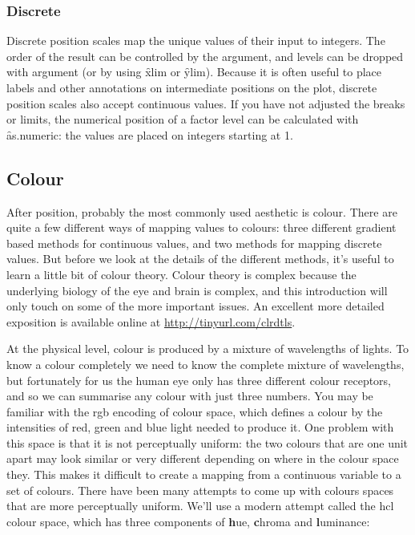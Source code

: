 \subsubsection{Discrete}
\label{sub:scale-discrete}

Discrete position scales map the unique values of their input to integers.  The order of the result can be controlled by the  argument, and levels can be dropped with  argument (or by using \f{xlim} or \f{ylim}).  Because it is often useful to place labels and other annotations on intermediate positions on the plot, discrete position scales also accept continuous values.  If you have not adjusted the breaks or limits, the numerical position of a factor level can be calculated with \f{as.numeric}: the values are placed on integers starting at 1.


\subsection{Colour}
\label{sub:scale-colour}

After position, probably the most commonly used aesthetic is colour. There are quite a few different ways of mapping values to colours: three different gradient based methods for continuous values, and two methods for mapping discrete values. But before we look at the details of the different methods, it's useful to learn a little bit of colour theory. Colour theory is complex because the underlying biology of the eye and brain is complex, and this introduction will only touch on some of the more important issues. An excellent more detailed exposition is available online at \url{http://tinyurl.com/clrdtls}.

At the physical level, colour is produced by a mixture of wavelengths of lights. To know a colour completely we need to know the complete mixture of wavelengths, but fortunately for us the human eye only has three different colour receptors, and so we can summarise any colour with just three numbers. You may be familiar with the rgb encoding of colour space, which defines a colour by the intensities of red, green and blue light needed to produce it. One problem with this space is that it is not perceptually uniform: the two colours that are one unit apart may look similar or very different depending on where in the colour space they. This makes it difficult to create a mapping from a continuous variable to a set of colours.  There have been many attempts to come up with colours spaces that are more perceptually uniform.  We'll use a modern attempt called the hcl colour space, which has three components of {\bf h}ue, {\bf c}hroma and {\bf l}uminance:

